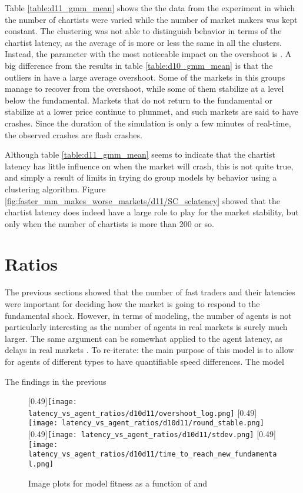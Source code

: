 Table \ref{table:d11_gmm_mean} shows the the data from the experiment in which the number of chartists were varied while the number of market makers was kept constant. The clustering was not able to distinguish behavior in terms of the chartist latency, as the average of \sclatencymu{} is more or less the same in all the clusters. Instead, the parameter with the most noticeable impact on the overshoot is \scnAgents. A big difference from the results in table \ref{table:d10_gmm_mean} is that the outliers in \deleven{} have a large average overshoot. Some of the markets in this groups manage to recover from the overshoot, while some of them stabilize at a level below the fundamental. Markets that do not return to the fundamental or stabilize at a lower price continue to plummet, and such markets are said to have crashes. Since the duration of the simulation is only a few minutes of real-time, the observed crashes are flash crashes.

Although table \ref{table:d11_gmm_mean} seems to indicate that the chartist latency has little influence on when the market will crash, this is not quite true, and simply a result of limits in trying do group models by behavior using a clustering algorithm. Figure \ref{fig:faster_mm_makes_worse_markets/d11/SC_sclatency} showed that the chartist latency does indeed have a large role to play for the market stability, but only when the number of chartists is more than 200 or so. 



\section{Ratios}
The previous sections showed that the number of fast traders and their latencies were important for deciding how the market is going to respond to the fundamental shock. However, in terms of modeling, the number of agents is not particularly interesting as the number of agents in real markets is surely much larger. The same argument can be somewhat applied to the agent latency, as delays in real markets . To re-iterate: the main purpose of this model is to allow for agents of different types to have quantifiable speed differences. The model 

The findings in the previous 

 \begin{figure}
 	\centering
 	\subcaptionbox{\overshoot}[0.49\linewidth]{\texttt{[image: latency\_vs\_agent\_ratios/d10d11/overshoot\_log.png]}}
 	\subcaptionbox{\roundstable}[0.49\linewidth]{\texttt{[image: latency\_vs\_agent\_ratios/d10d11/round\_stable.png]}}
 	\subcaptionbox{\stdev}[0.49\linewidth]{\texttt{[image: latency\_vs\_agent\_ratios/d10d11/stdev.png]}}
 	\subcaptionbox{\timetoreachnewfundamental}[0.49\linewidth]{\texttt{[image: latency\_vs\_agent\_ratios/d10d11/time\_to\_reach\_new\_fundamental.png]}}
	\caption{Image plots for model fitness as a function of \ratioagents{} and \ratiolatency}
 	\label{fig:ratio_image}
 \end{figure}


